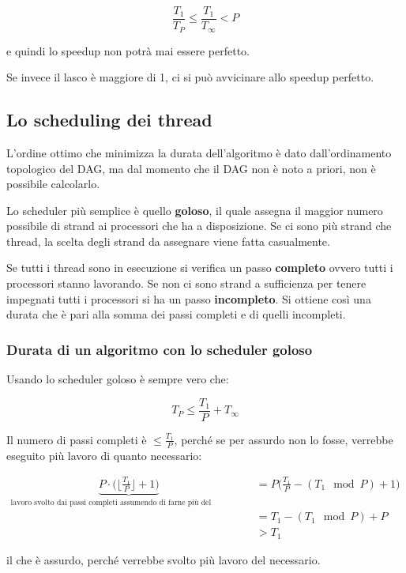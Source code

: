 $$\frac{T_1}{T_P} \leq \frac{T_1}{T_\infty} < P$$

e quindi lo speedup non potrà mai essere perfetto. 

Se invece il lasco è maggiore di 1, ci si può avvicinare allo speedup perfetto.

\subsection{Lo scheduling dei thread}\label{lo-scheduling-dei-thread}

L'ordine ottimo che minimizza la durata dell'algoritmo è dato dall'ordinamento topologico del DAG, ma dal momento che il DAG non è noto a priori, non è possibile calcolarlo.

Lo scheduler più semplice è quello \textbf{goloso}, il quale assegna il maggior numero possibile di strand ai processori che ha a disposizione. Se ci sono più strand che thread, la scelta degli strand da assegnare viene fatta casualmente.

Se tutti i thread sono in esecuzione si verifica un passo \textbf{completo} ovvero tutti i processori stanno lavorando. 
Se non ci sono strand a sufficienza per tenere impegnati tutti i processori si ha un passo \textbf{incompleto}. 
Si ottiene così una durata che è pari alla somma dei passi completi e di quelli incompleti.

\subsubsection{Durata di un algoritmo con lo scheduler goloso}

Usando lo scheduler goloso è sempre vero che:

$$T_P \leq \frac{T_1}{P} + T_\infty$$

Il numero di passi completi è $\leq \frac{T_1}{P}$, perché se per assurdo non lo fosse, verrebbe eseguito più lavoro di quanto necessario:

\begin{align*}
\underbrace{P \cdot \bigg(\bigg\lfloor \frac{T_1}{P}\bigg\rfloor +1 \bigg)}_{\text{lavoro svolto dai passi completi assumendo di farne più del necessario}} &= P \bigg( \frac{T_1}{P} - (T_1 \mod P) +1 \bigg) \\
&= T_1 - (T_1 \mod P) + P \\
&> T_1
\end{align*}

 il che è assurdo, perché verrebbe svolto più lavoro del necessario.

